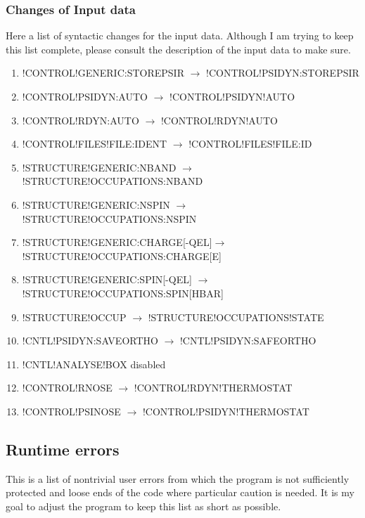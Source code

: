 \documentclass[final,12pt]{article}
\begin{document}
\subsubsection{Changes of Input data}

Here a list of syntactic changes for the input data. Although I am
trying to keep this list complete, please consult the description of
the input data to make sure.

\begin{enumerate}
\item !CONTROL!GENERIC:STOREPSIR \break$\rightarrow$ !CONTROL!PSIDYN:STOREPSIR
\item !CONTROL!PSIDYN:AUTO \break$\rightarrow$ !CONTROL!PSIDYN!AUTO
\item !CONTROL!RDYN:AUTO \break$\rightarrow$ !CONTROL!RDYN!AUTO
\item !CONTROL!FILES!FILE:IDENT \break$\rightarrow$ !CONTROL!FILES!FILE:ID
\item !STRUCTURE!GENERIC:NBAND \break$\rightarrow$ !STRUCTURE!OCCUPATIONS:NBAND
\item !STRUCTURE!GENERIC:NSPIN \break$\rightarrow$ !STRUCTURE!OCCUPATIONS:NSPIN
\item !STRUCTURE!GENERIC:CHARGE[-QEL]\break$\rightarrow$ !STRUCTURE!OCCUPATIONS:CHARGE[E]
\item !STRUCTURE!GENERIC:SPIN[-QEL] \break$\rightarrow$ !STRUCTURE!OCCUPATIONS:SPIN[HBAR]
\item !STRUCTURE!OCCUP \break$\rightarrow$ !STRUCTURE!OCCUPATIONS!STATE
\item !CNTL!PSIDYN:SAVEORTHO \break$\rightarrow$ !CNTL!PSIDYN:SAFEORTHO
\item !CNTL!ANALYSE!BOX disabled
\item !CONTROL!RNOSE \break$\rightarrow$ !CONTROL!RDYN!THERMOSTAT
\item !CONTROL!PSINOSE \break$\rightarrow$ !CONTROL!PSIDYN!THERMOSTAT
\end{enumerate}

\subsection{Runtime errors}

This is a list of nontrivial user errors from which the program is not
sufficiently protected and loose ends of the code where particular
caution is needed. It is my goal to adjust the program to
keep this list as short as possible.
\end{document}
